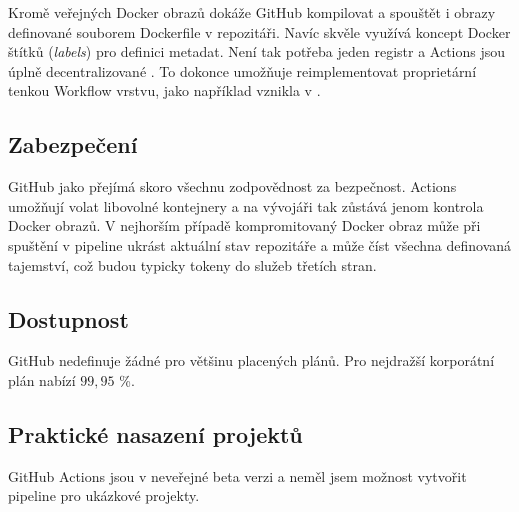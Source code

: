         Kromě veřejných Docker obrazů dokáže GitHub kompilovat a spouštět i obrazy definované souborem Dockerfile v repozitáři. Navíc skvěle využívá koncept Docker štítků (\textit{labels}) pro definici metadat. Není tak potřeba jeden registr a Actions jsou úplně decentralizované \cite{ga-labels}. To dokonce umožňuje reimplementovat proprietární tenkou Workflow vrstvu, jako například vznikla v  \cite{nektos-act}.

    \subsection{Zabezpečení}
        GitHub jako  přejímá skoro všechnu zodpovědnost za bezpečnost. Actions umožňují volat libovolné kontejnery a na vývojáři tak zůstává jenom kontrola Docker obrazů. V nejhorším případě kompromitovaný Docker obraz může při spuštění v pipeline ukrást aktuální stav repozitáře a může číst všechna definovaná tajemství, což budou typicky tokeny do služeb třetích stran.

    \subsection{Dostupnost}
        GitHub nedefinuje žádné  pro většinu placených plánů. Pro nejdražší korporátní plán nabízí  $99,95$ \%.

    \subsection{Praktické nasazení projektů}
        GitHub Actions jsou v neveřejné beta verzi a neměl jsem možnost vytvořit pipeline pro ukázkové projekty. 
